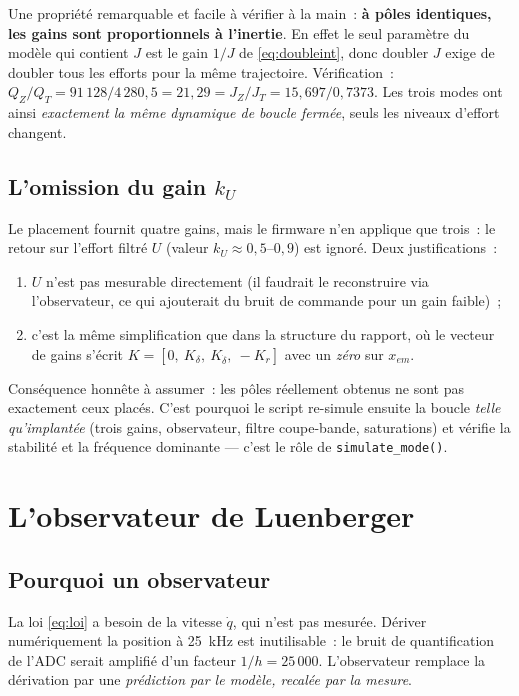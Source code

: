\documentclass[a4paper,11pt]{article}
\newcommand{\qm}{q}
\begin{document}
Une propriété remarquable et facile à vérifier à la main~: \textbf{à pôles
identiques, les gains sont proportionnels à l'inertie}. En effet le seul
paramètre du modèle qui contient $J$ est le gain $1/J$ de \eqref{eq:doubleint},
donc doubler $J$ exige de doubler tous les efforts pour la même trajectoire.
Vérification~: $Q_Z / Q_T = 91\,128 / 4\,280{,}5 = 21{,}29 = J_Z / J_T =
15{,}697 / 0{,}7373$. Les trois modes ont ainsi \emph{exactement la même
dynamique de boucle fermée}, seuls les niveaux d'effort changent.

\subsection{L'omission du gain $k_U$}
\label{subsec:ku}

Le placement fournit quatre gains, mais le firmware n'en applique que trois~:
le retour sur l'effort filtré $U$ (valeur $k_U \approx 0{,}5$--$0{,}9$) est
ignoré. Deux justifications~:
\begin{enumerate}
    \item $U$ n'est pas mesurable directement (il faudrait le reconstruire via
          l'observateur, ce qui ajouterait du bruit de commande pour un gain
          faible)~;
    \item c'est la même simplification que dans la structure du rapport, où le
          vecteur de gains s'écrit $K = [0,\ K_\delta,\ K_{\dot\delta},\ -K_r]$
          avec un \emph{zéro} sur $x_{em}$.
\end{enumerate}
Conséquence honnête à assumer~: les pôles réellement obtenus ne sont pas
exactement ceux placés. C'est pourquoi le script re-simule ensuite la boucle
\emph{telle qu'implantée} (trois gains, observateur, filtre coupe-bande,
saturations) et vérifie la stabilité et la fréquence dominante --- c'est le
rôle de \texttt{simulate\_mode()}.

\section{L'observateur de Luenberger}
\label{sec:obs}

\subsection{Pourquoi un observateur}

La loi \eqref{eq:loi} a besoin de la vitesse $\dot{\qm}$, qui n'est pas
mesurée. Dériver numériquement la position à 25~kHz est inutilisable~: le
bruit de quantification de l'ADC serait amplifié d'un facteur $1/h = 25\,000$.
L'observateur remplace la dérivation par une \emph{prédiction par le modèle,
recalée par la mesure}.
\end{document}
